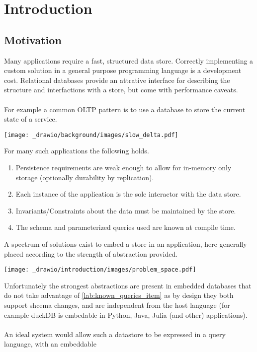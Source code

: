 \chapter{Introduction}
\section{Motivation}
Many applications require a fast, structured data store. Correctly implementing
a custom solution in a general purpose programming language is a development cost.
Relational databases provide an attrative interface for describing the structure
and interfactions with a store, but come with performance caveats.
\\
\\ For example a common OLTP pattern is to use a database to store the current state of a service.
\begin{center}
    \texttt{[image: \_drawio/background/images/slow\_delta.pdf]}
\end{center}
\vspace{-1cm}
\noindent For many such applications the following holds.
\begin{enumerate}
    \setlength\itemsep{0em}
    \item Persistence requirements are weak enough to allow for in-memory only storage (optionally durability by replication).
    \item Each instance of the application is the sole interactor with the data store.
    \item Invariants/Constraints about the data must be maintained by the store.
    \item The schema and parameterized queries used are known at compile time. \label{lab:known_queries_item}
\end{enumerate}
A spectrum of solutions exist to embed a store in an application, here generally placed according to the strength of abstraction provided.
\begin{center}
    \texttt{[image: \_drawio/introduction/images/problem\_space.pdf]}
\end{center}
Unfortunately the strongest abstractions are present in embedded databases that do not take advantage of \ref{lab:known_queries_item} as by design they both support shcema changes, and are independent from the host language (for example duckDB is embedable in Python, Java, Julia (and other) applications).
\\
\\
An ideal system would allow such a datastore to be expressed in a query language, with an embeddable
